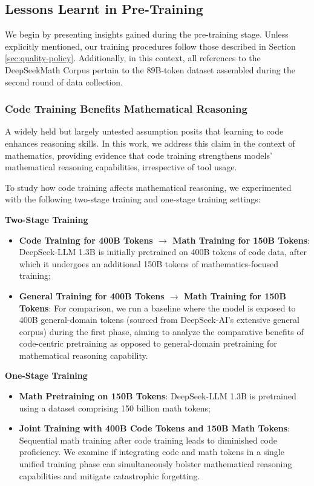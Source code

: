 \begin{itemize}[topsep=0pt]
\begin{itemize}[topsep=0pt]
\subsection{Lessons Learnt in Pre-Training}

We begin by presenting insights gained during the pre-training stage. Unless explicitly mentioned, our training procedures follow those described in Section \ref{sec:quality-policy}. Additionally, in this context, all references to the DeepSeekMath Corpus pertain to the 89B-token dataset assembled during the second round of data collection.

\subsubsection{Code Training Benefits Mathematical Reasoning}

A widely held but largely untested assumption posits that learning to code enhances reasoning skills. In this work, we address this claim in the context of mathematics, providing evidence that code training strengthens models’ mathematical reasoning capabilities, irrespective of tool usage.

To study how code training affects mathematical reasoning, we experimented with the following two-stage training and one-stage training settings:

\textbf{Two-Stage Training}

\begin{itemize}[topsep=0pt]
    \item \textbf{Code Training for 400B Tokens $\rightarrow$ Math Training for 150B Tokens}: DeepSeek-LLM 1.3B is initially pretrained on 400B tokens of code data, after which it undergoes an additional 150B tokens of mathematics-focused training;
    \item \textbf{General Training for 400B Tokens $\rightarrow$ Math Training for 150B Tokens}: For comparison, we run a baseline where the model is exposed to 400B general-domain tokens (sourced from DeepSeek-AI’s extensive general corpus) during the first phase, aiming to analyze the comparative benefits of code-centric pretraining as opposed to general-domain pretraining for mathematical reasoning capability.
\end{itemize}

\textbf{One-Stage Training}

\begin{itemize}[topsep=0pt]
    \item \textbf{Math Pretraining on 150B Tokens}: DeepSeek-LLM 1.3B is pretrained using a dataset comprising 150 billion math tokens;
    \item \textbf{Joint Training with 400B Code Tokens and 150B Math Tokens}: Sequential math training after code training leads to diminished code proficiency. We examine if integrating code and math tokens in a single unified training phase can simultaneously bolster mathematical reasoning capabilities and mitigate catastrophic forgetting.
\end{itemize}


\end{itemize}
\end{itemize}
